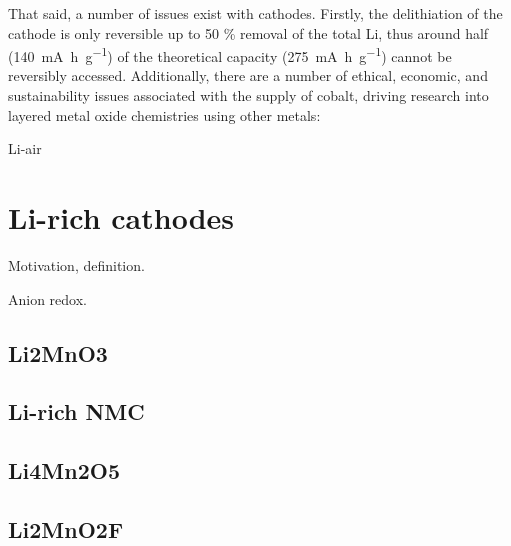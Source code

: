 That said, a number of issues exist with  cathodes.
Firstly, the delithiation of the cathode is only reversible up to 50 \% removal of the total Li, thus around half (\SI{140}{\milli\ampere\hour\per\gram}) of the theoretical capacity (\SI{275}{\milli\ampere\hour\per\gram}) cannot be reversibly accessed.
Additionally, there are a number of ethical, economic, and sustainability issues associated with the supply of cobalt,\cite{Mauger2017, Larcher2015} driving research into layered metal oxide chemistries using other metals:\cite{Rozier2015}


Li-air


\section{Li-rich cathodes}

Motivation, definition.

Anion redox. \cite{Yahia2019}


\subsection{Li2MnO3}

\subsection{Li-rich NMC}

\subsection{Li4Mn2O5}
\subsection{Li2MnO2F}




